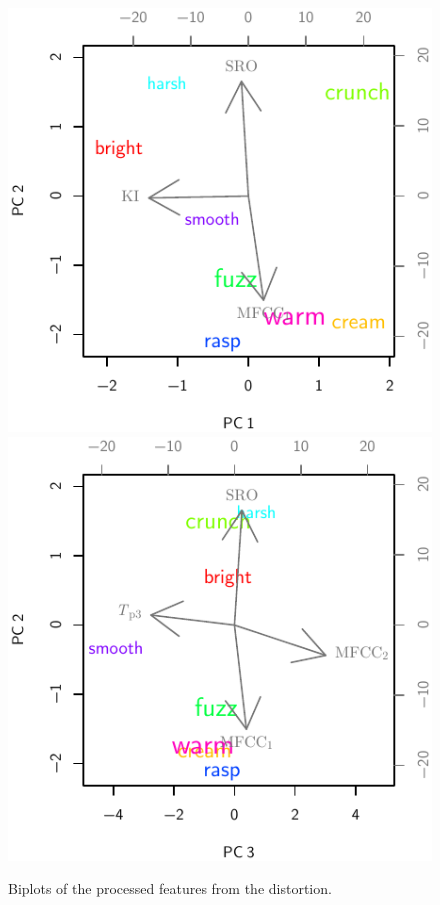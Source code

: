 			\begin{figure}[h!]
				\centering
				\subfloat
				{
					\includegraphics{chapter4/Images/DistortionProcessedCentroidsPCA1-2.pdf}
					\label{fig:DistortionProcessedCentroidsPCA1-2}
				}
				\quad
				\subfloat
				{
					\includegraphics{chapter4/Images/DistortionProcessedCentroidsPCA3-2.pdf}
					\label{fig:DistortionProcessedCentroidsPCA3-2}
				}
				\caption{Biplots of the processed features from the distortion.}
				\label{fig:DistortionProcessedCentroidsPCAs}
			\end{figure}


